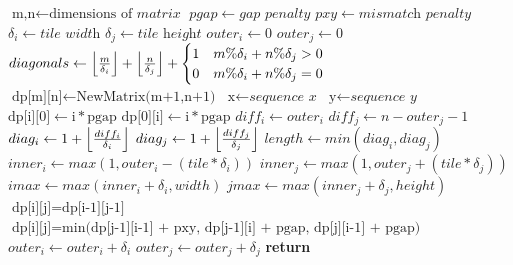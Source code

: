 

\begin{algorithm}
\caption{Parallel Smith-Waterman}\label{alg:parsmith}
\begin{algorithmic}[1]
\State $\text{m,n} \gets \text{dimensions of }\textit{matrix}$
\State $pgap \gets \textit{gap penalty}$
\State $pxy \gets \textit{mismatch penalty}$
\State $\delta_i \gets \textit{tile width}$
\State $\delta_j \gets \textit{tile height}$
\State $outer_i \gets 0$
\State $outer_j \gets 0$
\State $diagonals \gets \left\lfloor \frac{m}{\delta_i} \right\rfloor + \left\lfloor \frac{n}{\delta_j} \right\rfloor + \begin{cases} 
      1 & m\%\delta_i + n\%\delta_j > 0 \\
      0 & m\%\delta_i + n\%\delta_j = 0 \\
    \end{cases}$
\State $\text{dp[m][n]} \gets \text{NewMatrix(m+1,n+1)}$
\State $\text{x} \gets \textit{sequence x}$
\State $\text{y} \gets \textit{sequence y}$
    \State $\text{dp[i][0]} \gets \text{i} * \text{pgap}$
\EndFor
{}
    \State $\text{dp[0][i]} \gets \text{i} * \text{pgap}$
\EndFor
{}
    \State $diff_i \gets outer_i$
    \State $diff_j \gets n-outer_j-1$
    \State $diag_i \gets 1 + \left\lfloor \frac{diff_i}{\delta_i} \right\rfloor$
    \State $diag_j \gets 1 + \left\lfloor \frac{diff_j}{\delta_j} \right\rfloor$
    \State $length \gets min(diag_i, diag_j)$
        \State $inner_i \gets max(1, outer_i - (tile*\delta_i))$
        \State $inner_j \gets max(1, outer_j + (tile*\delta_j))$
    	\State $imax \gets max(inner_i + \delta_i, width)$
    	\State $jmax \gets max(inner_j + \delta_j, height)$
        		    \State $\text{dp[i][j]} = \text{dp[i-1][j-1]}$
        	    \Else
        		    \State $\text{dp[i][j]} = \text{min(dp[j-1][i-1] + pxy, dp[j-1][i] + pgap, dp[j][i-1] + pgap)}$
        	    \EndIf
            \EndFor
        \EndFor
    \EndFor
        \State $outer_i \gets outer_i + \delta_i$
    \Else
        \State $outer_j \gets outer_j + \delta_j$
    \EndIf
\EndFor
\textbf{return } 
\EndProcedure
\end{algorithmic}
\end{algorithm}
